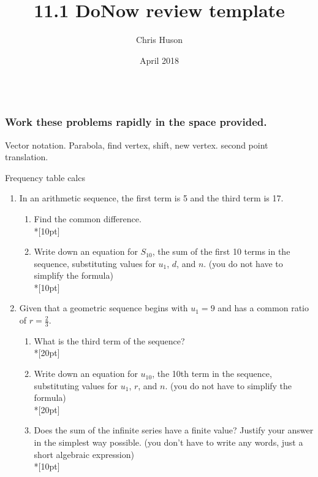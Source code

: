\documentclass[12pt, oneside]{article}
\title{11.1 DoNow review template}
\author{Chris Huson}
\date{April 2018}
\begin{document}
\subsubsection*{\\ \textnormal{Work these problems rapidly in the space provided.}}

Vector notation. Parabola, find vertex, shift, new vertex. second point translation.

Frequency table calcs

\begin{enumerate}
\item In an arithmetic sequence, the first term is 5 and the third term is 17.
\begin{enumerate}
    \item Find the common difference.\\*[10pt]
    \item Write down an equation for $S_{10}$, the sum of the first 10 terms in the sequence, substituting values for $u_1$, $d$, and $n$. (you do not have to simplify the formula)\\*[10pt]
\end{enumerate}

\item Given that a geometric sequence begins with $u_1=9$ and has a common ratio of $r=\frac{2}{3}$.
\begin{enumerate}
    \item What is the third term of the sequence?\\*[20pt]
    \item Write down an equation for $u_{10}$, the 10th term in the sequence, substituting values for $u_1$, $r$, and $n$. (you do not have to simplify the formula)\\*[20pt]
    \item Does the sum of the infinite series have a finite value? Justify your answer in the simplest way possible. (you don't have to write any words, just a short algebraic expression)\\*[10pt]
\end{enumerate}


\end{enumerate}
\end{document}
